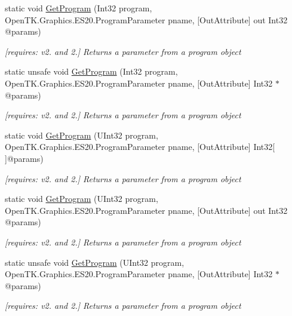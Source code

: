 \begin{DoxyCompactItemize}
static void \hyperlink{class_open_t_k_1_1_graphics_1_1_e_s20_1_1_g_l_a9d11ea7f0da12c4153dcc91371566642}{Get\-Program} (Int32 program, Open\-T\-K.\-Graphics.\-E\-S20.\-Program\-Parameter pname, \mbox{[}Out\-Attribute\mbox{]} out Int32 @params)
\begin{DoxyCompactList}\small\item\em \mbox{[}requires\-: v2. and 2.\mbox{]} Returns a parameter from a program object \end{DoxyCompactList}\item 
static unsafe void \hyperlink{class_open_t_k_1_1_graphics_1_1_e_s20_1_1_g_l_a58b0f1303d5b8902957dd7999ca00e33}{Get\-Program} (Int32 program, Open\-T\-K.\-Graphics.\-E\-S20.\-Program\-Parameter pname, \mbox{[}Out\-Attribute\mbox{]} Int32 $\ast$@params)
\begin{DoxyCompactList}\small\item\em \mbox{[}requires\-: v2. and 2.\mbox{]} Returns a parameter from a program object \end{DoxyCompactList}\item 
static void \hyperlink{class_open_t_k_1_1_graphics_1_1_e_s20_1_1_g_l_a8491553b421c246db2e5e3c519f19a07}{Get\-Program} (U\-Int32 program, Open\-T\-K.\-Graphics.\-E\-S20.\-Program\-Parameter pname, \mbox{[}Out\-Attribute\mbox{]} Int32\mbox{[}$\,$\mbox{]}@params)
\begin{DoxyCompactList}\small\item\em \mbox{[}requires\-: v2. and 2.\mbox{]} Returns a parameter from a program object \end{DoxyCompactList}\item 
static void \hyperlink{class_open_t_k_1_1_graphics_1_1_e_s20_1_1_g_l_a8c9686e89dc88fc74e49c4ee512956c5}{Get\-Program} (U\-Int32 program, Open\-T\-K.\-Graphics.\-E\-S20.\-Program\-Parameter pname, \mbox{[}Out\-Attribute\mbox{]} out Int32 @params)
\begin{DoxyCompactList}\small\item\em \mbox{[}requires\-: v2. and 2.\mbox{]} Returns a parameter from a program object \end{DoxyCompactList}\item 
static unsafe void \hyperlink{class_open_t_k_1_1_graphics_1_1_e_s20_1_1_g_l_a7962a77e5cf1abfe1df3ab4ff936891d}{Get\-Program} (U\-Int32 program, Open\-T\-K.\-Graphics.\-E\-S20.\-Program\-Parameter pname, \mbox{[}Out\-Attribute\mbox{]} Int32 $\ast$@params)
\begin{DoxyCompactList}\small\item\em \mbox{[}requires\-: v2. and 2.\mbox{]} Returns a parameter from a program object \end{DoxyCompactList}\item 

\end{DoxyCompactItemize}
